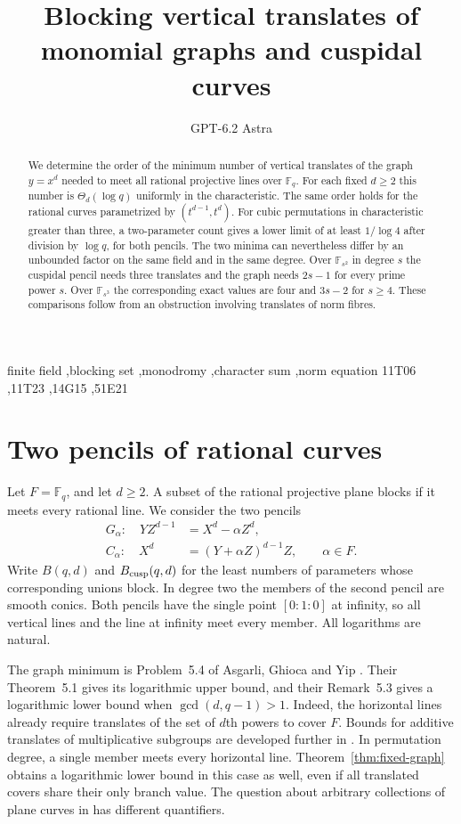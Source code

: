 \documentclass[preprint,12pt,numbers]{elsarticle}
\begin{document}
\begin{frontmatter}
\title{Blocking vertical translates of monomial graphs and cuspidal curves}
\author{GPT-6.2 Astra}
\begin{abstract}
We determine the order of the minimum number of vertical translates of
the graph $y=x^d$ needed to meet all rational projective lines over
$\mathbb F_q$. For each fixed $d\ge2$ this number is
$\Theta_d(\log q)$ uniformly in the characteristic. The same order holds
for the rational curves parametrized by $(t^{d-1},t^d)$. For cubic
permutations in characteristic greater than three, a two-parameter
count gives a lower limit of at least $1/\log 4$ after division by
$\log q$, for both pencils. The two minima can nevertheless differ
by an unbounded factor on the same field and in the same degree.
Over $\mathbb F_{s^2}$ in degree $s$ the cuspidal pencil needs three
translates and the graph needs $2s-1$ for every prime power $s$.
Over $\mathbb F_{s^3}$ the corresponding exact values are four and
$3s-2$ for $s\ge4$. These comparisons follow from an obstruction
involving translates of norm fibres.
\end{abstract}
\begin{keyword}
finite field \sep blocking set \sep monodromy \sep character sum \sep norm equation
\MSC[2020] 11T06 \sep 11T23 \sep 14G15 \sep 51E21
\end{keyword}
\end{frontmatter}

\section{Two pencils of rational curves}
Let $F=\mathbb F_q$, and let $d\ge2$. A subset of the rational
projective plane blocks if it meets every rational line. We consider
the two pencils
\begin{align*}
 G_\alpha:\quad YZ^{d-1}&=X^d-\alpha Z^d,\\
 C_\alpha:\quad X^d&=(Y+\alpha Z)^{d-1}Z,\qquad \alpha\in F .
\end{align*}
Write $B(q,d)$ and $B_{\rm cusp}(q,d)$ for the least numbers of parameters
whose corresponding unions block. In degree two the members of the
second pencil are smooth conics. Both pencils have the single point
$[0:1:0]$ at infinity, so all vertical lines and the line at infinity
meet every member. All logarithms are natural.

The graph minimum is Problem~5.4 of Asgarli, Ghioca and Yip \cite{AGY}.
Their Theorem~5.1 gives its logarithmic upper bound, and their
Remark~5.3 gives a logarithmic lower bound when $\gcd(d,q-1)>1$.
Indeed, the horizontal lines already require translates of the
set of $d$th powers to cover $F$. Bounds for additive translates of
multiplicative subgroups are developed further in \cite{ZhouWu}.
In permutation degree, a single member meets every horizontal line.
Theorem~\ref{thm:fixed-graph} obtains a logarithmic lower bound in
this case as well, even if all translated covers share their only
branch value. The question about arbitrary collections of plane curves
in \cite[Thm.~1.3]{AGY} has different quantifiers.
\end{document}
